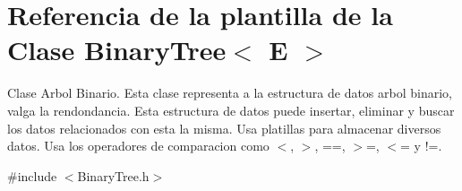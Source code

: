 \hypertarget{classBinaryTree}{\section{Referencia de la plantilla de la Clase Binary\-Tree$<$ E $>$}
\label{classBinaryTree}
}


Clase Arbol Binario. Esta clase representa a la estructura de datos arbol binario, valga la rendondancia. Esta estructura de datos puede insertar, eliminar y buscar los datos relacionados con esta la misma. Usa platillas para almacenar diversos datos. Usa los operadores de comparacion como $<$, $>$, ==, $>$=, $<$= y !=.  




{\ttfamily \#include $<$Binary\-Tree.\-h$>$}

